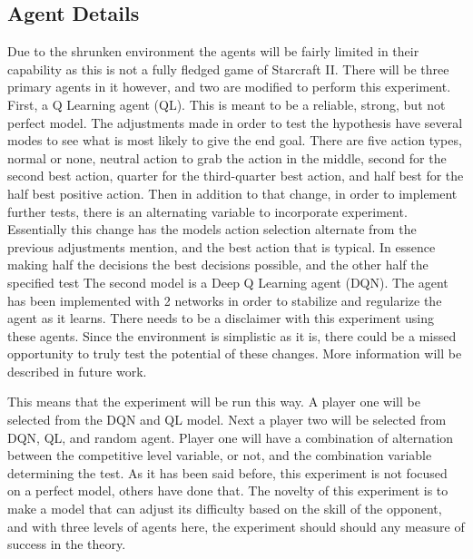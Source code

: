 \subsection{Agent Details}
Due to the shrunken environment the agents will be fairly limited in their capability as this is not a fully fledged game of Starcraft II. There will be three primary agents in it however, and two are modified to perform this experiment. First, a Q Learning
agent (QL). This is meant to be a reliable, strong, but not perfect model. The adjustments made in order to test the hypothesis have several modes to see what is most likely to give the end goal. There are five action types, normal or none, neutral action to grab
the action in the middle, second for the second best action, quarter for the third-quarter best action, and half best for the half best positive action. Then in addition to that change, in order to implement further tests, there is an alternating variable
to incorporate experiment. Essentially this change has the models action selection alternate from the previous adjustments mention, and the best action that is typical. In essence making half the decisions the best decisions possible, and the other half the 
specified test The second model is a Deep Q Learning agent (DQN). The agent has been implemented with 2 networks in order to stabilize and regularize the agent as it learns. There needs to be a disclaimer with this experiment using these agents. 
Since the environment is simplistic as it is, there could be a missed opportunity to truly test the potential of these changes. More information will be described in future work.

This means that the experiment will be run this way. A player one will be selected from the DQN and QL model. Next a player two will be selected from DQN, QL, and random agent. Player one will have a combination of alternation between the competitive level 
variable, or not, and the combination variable determining the test. As it has been said before, this experiment is not focused on a perfect model, others have done that. The novelty of this experiment is to make a model that can adjust its difficulty based 
on the skill of the opponent, and with three levels of agents here, the experiment should should any measure of success in the theory. 